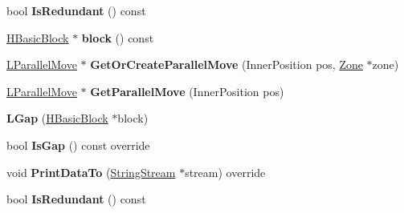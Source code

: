 \begin{DoxyCompactItemize}
\item 
bool {\bfseries Is\+Redundant} () const \hypertarget{classv8_1_1internal_1_1_l_gap_afd74524d060224489b5e7095e3354e1e}{}\label{classv8_1_1internal_1_1_l_gap_afd74524d060224489b5e7095e3354e1e}

\item 
\hyperlink{classv8_1_1internal_1_1_h_basic_block}{H\+Basic\+Block} $\ast$ {\bfseries block} () const \hypertarget{classv8_1_1internal_1_1_l_gap_a14ee6777d69e95f0c17ce3dcc0c6431e}{}\label{classv8_1_1internal_1_1_l_gap_a14ee6777d69e95f0c17ce3dcc0c6431e}

\item 
\hyperlink{classv8_1_1internal_1_1_l_parallel_move}{L\+Parallel\+Move} $\ast$ {\bfseries Get\+Or\+Create\+Parallel\+Move} (Inner\+Position pos, \hyperlink{classv8_1_1internal_1_1_zone}{Zone} $\ast$zone)\hypertarget{classv8_1_1internal_1_1_l_gap_afa07f91a1bdbab70770e57c45a4c93cd}{}\label{classv8_1_1internal_1_1_l_gap_afa07f91a1bdbab70770e57c45a4c93cd}

\item 
\hyperlink{classv8_1_1internal_1_1_l_parallel_move}{L\+Parallel\+Move} $\ast$ {\bfseries Get\+Parallel\+Move} (Inner\+Position pos)\hypertarget{classv8_1_1internal_1_1_l_gap_a80a7bd7cd4beef3be42928544646c5fb}{}\label{classv8_1_1internal_1_1_l_gap_a80a7bd7cd4beef3be42928544646c5fb}

\item 
{\bfseries L\+Gap} (\hyperlink{classv8_1_1internal_1_1_h_basic_block}{H\+Basic\+Block} $\ast$block)\hypertarget{classv8_1_1internal_1_1_l_gap_a065fcd3080fabb91cccfc541f7cf90f0}{}\label{classv8_1_1internal_1_1_l_gap_a065fcd3080fabb91cccfc541f7cf90f0}

\item 
bool {\bfseries Is\+Gap} () const  override\hypertarget{classv8_1_1internal_1_1_l_gap_aac0749ec3212db7ad37d7fcb6a7a31fd}{}\label{classv8_1_1internal_1_1_l_gap_aac0749ec3212db7ad37d7fcb6a7a31fd}

\item 
void {\bfseries Print\+Data\+To} (\hyperlink{classv8_1_1internal_1_1_string_stream}{String\+Stream} $\ast$stream) override\hypertarget{classv8_1_1internal_1_1_l_gap_ad22b85643ee0ccf9a50f8cc0e73abc19}{}\label{classv8_1_1internal_1_1_l_gap_ad22b85643ee0ccf9a50f8cc0e73abc19}

\item 
bool {\bfseries Is\+Redundant} () const \hypertarget{classv8_1_1internal_1_1_l_gap_afd74524d060224489b5e7095e3354e1e}{}\label{classv8_1_1internal_1_1_l_gap_afd74524d060224489b5e7095e3354e1e}


\end{DoxyCompactItemize}
